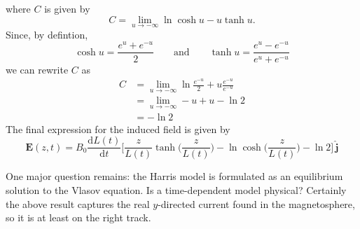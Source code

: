 \documentclass{article}
\begin{document}
	where $C$ is given by
	\[
		C = \lim_{u\to{-\infty}}\ln\cosh u - u\tanh u.
	\]
	Since, by defintion,
	\[
		\cosh u = \frac{e^u + e^{-u}}{2} \qquad \text{and} \qquad \tanh u = \frac{e^u - e^{-u}}{e^u + e^{-u}}
	\]
	we can rewrite $C$ as
	\begin{align*}
		C &= \lim_{u\to{-\infty}}\ln\frac{e^{-u}}{2} + u\frac{e^{-u}}{e^{-u}} \\
		&= \lim_{u\to-\infty}-u + u - \ln 2\\
		&= {-\ln 2}
	\end{align*}
	The final expression for the induced field is given by
	\[
		\mathbf{E}(z, t) = B_0\frac{\mathrm{d}L(t)}{\mathrm{d}t}\Big[\frac{z}{L(t)}\tanh\Big(\frac{z}{L(t)}\Big)- \ln\cosh\Big(\frac{z}{L(t)} \Big) - \ln 2\Big]\,\hat{\mathbf{j}}
	\]
	
	One major question remains: the Harris model is formulated as an equilibrium solution to the Vlasov equation. Is a time-dependent model physical? Certainly the above result captures the real $y$-directed current found in the magnetosphere, so it is at least on the right track.
	
\end{document}
